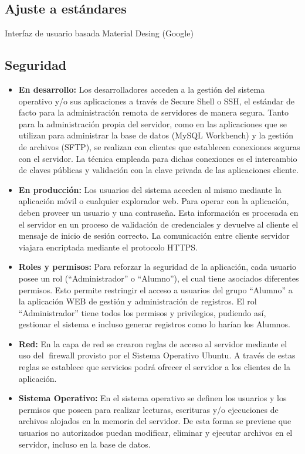     \subsection{Ajuste a estándares} Interfaz de usuario basada Material Desing (Google)

    \subsection{Seguridad} 
      \begin{itemize}
        
        \item \textbf{En desarrollo:} Los desarrolladores acceden a la gestión del sistema operativo y/o sus aplicaciones a través de Secure Shell o SSH, el estándar de facto para la administración remota de servidores de manera segura. Tanto para la administración propia del servidor, como en las aplicaciones que se utilizan para administrar la base de datos (MySQL Workbench) y la gestión de archivos (SFTP), se realizan con clientes que establecen conexiones seguras con el servidor. La técnica empleada para dichas conexiones es el intercambio de claves públicas y validación con la clave privada de las aplicaciones cliente.
        \item \textbf{En producción:} Los usuarios del sistema acceden al mismo mediante la aplicación móvil o cualquier explorador web. Para operar con la aplicación, deben proveer un usuario y una contraseña. Esta información es procesada en el servidor en un proceso de validación de credenciales y devuelve al cliente el mensaje de inicio de sesión correcto. La comunicación entre cliente servidor viajara encriptada mediante el protocolo \gls{HTTPS}.
        \item \textbf{Roles y permisos:} Para reforzar la seguridad de la aplicación, cada usuario posee un rol (``Administrador'' o ``Alumno''), el cual tiene asociados diferentes permisos. Esto permite restringir el acceso a usuarios del grupo ``Alumno'' a la aplicación WEB de gestión y administración de registros. El rol ``Administrador'' tiene todos los permisos y privilegios, pudiendo así, gestionar el sistema e incluso generar registros como lo harían los Alumnos.
        \item \textbf{Red:} En la capa de red se crearon reglas de acceso al servidor mediante el uso del firewall provisto por el Sistema Operativo Ubuntu. A través de estas reglas se establece que servicios podrá ofrecer el servidor a los clientes de la aplicación.
        \item \textbf{Sistema Operativo:} En el sistema operativo se definen los usuarios y los permisos que poseen para realizar lecturas, escrituras y/o ejecuciones de archivos alojados en la memoria del servidor. De esta forma se previene que usuarios no autorizados puedan modificar, eliminar y ejecutar archivos en el servidor, incluso en la base de datos.

\end{itemize}
